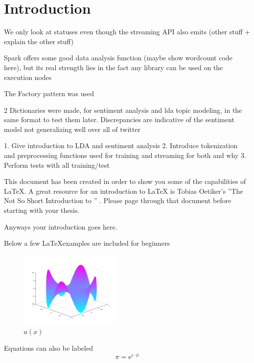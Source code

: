 \chapter{Introduction}

We only look at statuses even though the streaming API also emits (other stuff + explain the other stuff)

Spark offers some good data analysis function (maybe show wordcount code here), but its real strength lies in the fact any library can be used on the execution nodes

The Factory pattern was used

2 Dictionaries were made, for sentiment analysis and lda topic modeling, in the same format to test them later.
Discrepancies are indicative of the sentiment model not generalizing well over all of twitter


1. Give introduction to LDA and sentiment analysis
2. Introduce tokenization and preprocessing functions used for training and streaming for both and why
3. Perform tests with all training/test

\label{chapter:Introduction}
This document has been created in order to show you some of the capabilities
of \LaTeX. A great resource for an introduction to \LaTeX\xspace is Tobias
Oetiker's ''The Not So Short Introduction to \LaTeXe'' \cite{latex}. Please
page through that document
before starting with your thesis.
\par
Anyways your introduction goes here.


Below a few \LaTeX examples are included for beginners
\begin{figure}[ht]
    \centering
    \includegraphics[width=5cm]{images/swing_function_plot.png}
    \caption{$u(x)$}%
    \label{fig:swingPlot}
\end{figure}


Equations can also be labeled
\begin{equation}
    \pi = \mathrm{e}^{i\cdot\phi}
    \label{eq:equation1}
\end{equation}


